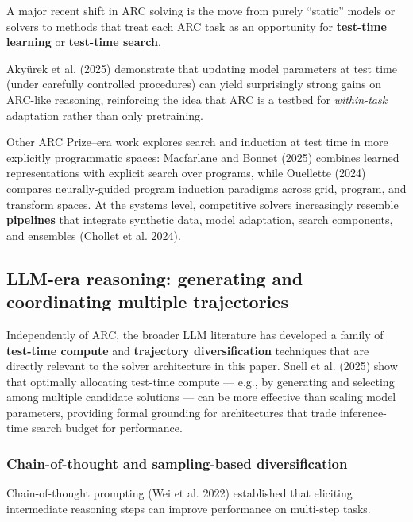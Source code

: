 \documentclass[11pt]{article}
\begin{document}
A major recent shift in ARC solving is the move from purely ``static''
models or solvers to methods that treat each ARC task as an opportunity
for \textbf{test-time learning} or \textbf{test-time search}.

Akyürek et al. (2025) demonstrate that updating model parameters at test
time (under carefully controlled procedures) can yield surprisingly
strong gains on ARC-like reasoning, reinforcing the idea that ARC is a
testbed for \emph{within-task} adaptation rather than only pretraining.

Other ARC Prize--era work explores search and induction at test time in
more explicitly programmatic spaces: Macfarlane and Bonnet (2025)
combines learned representations with explicit search over programs,
while Ouellette (2024) compares neurally-guided program induction
paradigms across grid, program, and transform spaces. At the systems
level, competitive solvers increasingly resemble \textbf{pipelines} that
integrate synthetic data, model adaptation, search components, and
ensembles (Chollet et al. 2024).

\hypertarget{llm-era-reasoning-generating-and-coordinating-multiple-trajectories}{%
\subsection{LLM-era reasoning: generating and coordinating multiple
trajectories}\label{llm-era-reasoning-generating-and-coordinating-multiple-trajectories}}

Independently of ARC, the broader LLM literature has developed a family
of \textbf{test-time compute} and \textbf{trajectory diversification}
techniques that are directly relevant to the solver architecture in this
paper. Snell et al. (2025) show that optimally allocating test-time
compute --- e.g., by generating and selecting among multiple candidate
solutions --- can be more effective than scaling model parameters,
providing formal grounding for architectures that trade inference-time
search budget for performance.

\hypertarget{chain-of-thought-and-sampling-based-diversification}{%
\subsubsection{Chain-of-thought and sampling-based
diversification}\label{chain-of-thought-and-sampling-based-diversification}}

Chain-of-thought prompting (Wei et al. 2022) established that eliciting
intermediate reasoning steps can improve performance on multi-step
tasks.
\end{document}
